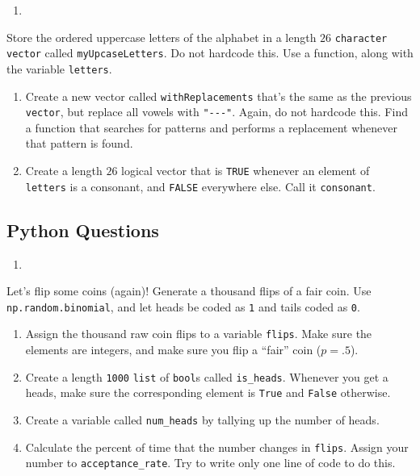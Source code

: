 \documentclass[
  12pt,
  krantz2]{krantz}
\providecommand{\tightlist}{%
  \setlength{\itemsep}{0pt}\setlength{\parskip}{0pt}}
\begin{document}
\begin{enumerate}
\def\labelenumi{\arabic{enumi}.}
\setcounter{enumi}{6}
\tightlist
\item
\end{enumerate}

Store the ordered uppercase letters of the alphabet in a length \(26\) \texttt{character} \texttt{vector} called \texttt{myUpcaseLetters}. Do not hardcode this. Use a function, along with the variable \texttt{letters}.

\begin{enumerate}
\def\labelenumi{\alph{enumi})}
\item
  Create a new vector called \texttt{withReplacements} that's the same as the previous \texttt{vector}, but replace all vowels with \texttt{"-\/-\/-"}. Again, do not hardcode this. Find a function that searches for patterns and performs a replacement whenever that pattern is found.
\item
  Create a length \(26\) logical vector that is \texttt{TRUE} whenever an element of \texttt{letters} is a consonant, and \texttt{FALSE} everywhere else. Call it \texttt{consonant}.
\end{enumerate}

\hypertarget{python-questions-1}{%
\subsection{Python Questions}\label{python-questions-1}}

\begin{enumerate}
\def\labelenumi{\arabic{enumi}.}
\tightlist
\item
\end{enumerate}

Let's flip some coins (again)! Generate a thousand flips of a fair coin. Use \texttt{np.random.binomial}, and let heads be coded as \texttt{1} and tails coded as \texttt{0}.

\begin{enumerate}
\def\labelenumi{\alph{enumi})}
\tightlist
\item
  Assign the thousand raw coin flips to a variable \texttt{flips}. Make sure the elements are integers, and make sure you flip a ``fair'' coin (\(p=.5\)).
\item
  Create a length \texttt{1000} \texttt{list} of \texttt{bool}s called \texttt{is\_heads}. Whenever you get a heads, make sure the corresponding element is \texttt{True} and \texttt{False} otherwise.
\item
  Create a variable called \texttt{num\_heads} by tallying up the number of heads.
\item
  Calculate the percent of time that the number changes in \texttt{flips}. Assign your number to \texttt{acceptance\_rate}. Try to write only one line of code to do this.
\end{enumerate}
\end{document}
